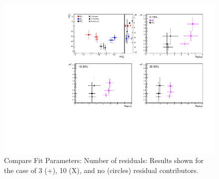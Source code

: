 \documentclass[/home/jesse/Analysis/FemtoAnalysis/AnalysisNotes/AnalysisNoteJBuxton.tex]{subfiles}
\begin{document}
\begin{figure}[h]
  \centering
  \includegraphics[width=\textwidth]{7_ResultsAndDiscussion/Figures/New/CompareAllScattParamswSys_CompNRes_Std_StatOnly.pdf}
  \caption[Compare Fit Parameters: Number of residuals]{Compare Fit Parameters: Number of residuals: Results shown for the case of 3 (+), 10 (X), and no (circles) residual contributors.}
  \label{fig:CompareAllScattParams_CompNumRes}
\end{figure}
\end{document}
